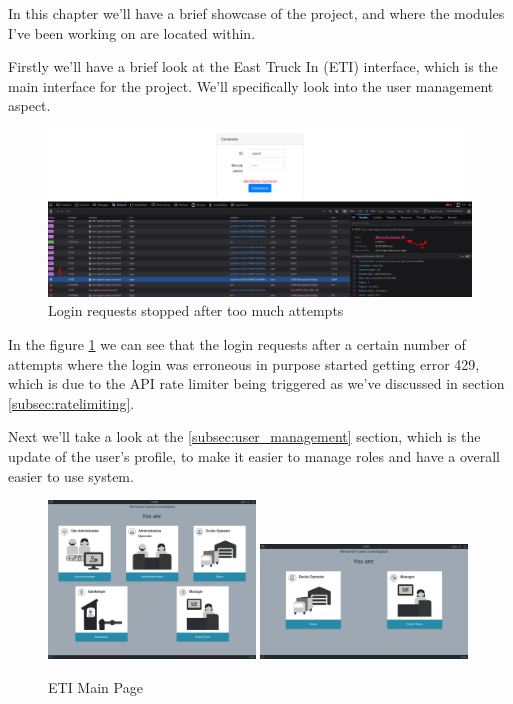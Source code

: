 In this chapter we'll have a brief showcase of the project, and where the modules
I've been working on are located within.

Firstly we'll have a brief look at the East Truck In (ETI) interface, which is 
the main interface for the project. We'll specifically look into the user management
aspect.

\begin{figure}[!ht]
    \centering
    \includegraphics[width=\textwidth]{images/login too much attempts}
    \caption{Login requests stopped after too much attempts}
    \label{fig:login_req_ratelimit}
\end{figure}

In the figure \ref{fig:login_req_ratelimit} we can see that the login requests after a
certain number of attempts where the login was erroneous in purpose started getting
error 429, which is due to  the API rate limiter being triggered as we've discussed in
section \ref{subsec:ratelimiting}.

Next we'll take a look at the \ref{subsec:user_management} section, which is the
update of the user's profile, to make it easier to manage roles and have a overall easier
to use system.

\begin{figure}[!ht]
    \centering
    \includegraphics[width=0.49\textwidth]{images/user management}\hfill
    \includegraphics[width=0.49\textwidth]{images/userLessRoles}
    \caption{ETI Main Page}
    \label{fig:user_management_view}
\end{figure}

